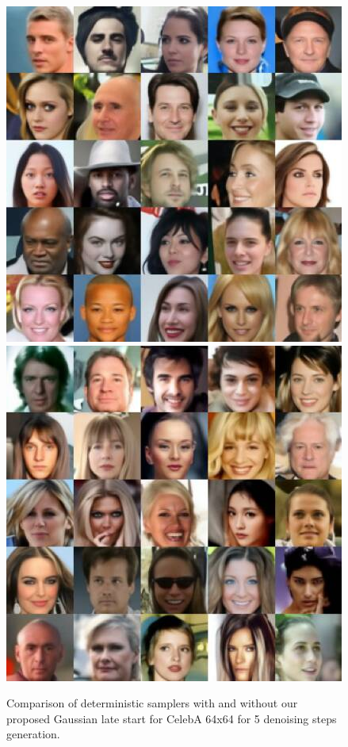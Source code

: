 \begin{figure}[ht!]
\endminipage \hfill
{}
  \includegraphics[width=\linewidth]{figs/imgs/ddpm_psdm_celeba64_data_samples_T_800_5_steps_25.jpg}
\endminipage \hfill
  \includegraphics[width=\linewidth]{figs/imgs/ddpm_psdm_celeba64_data_samples_T_500_5_steps_ga_25.jpg}
\endminipage \hfill
\caption{Comparison of deterministic samplers with and without our proposed Gaussian late start for CelebA 64x64 for 5 denoising steps generation.}
\label{fig:compare_celeba}
\end{figure}



